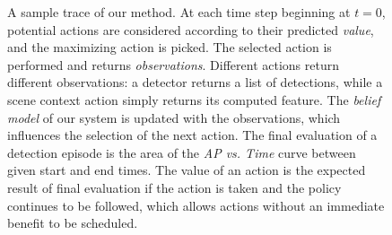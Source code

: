 \begin{figure}[ht!]
  \caption{
A sample trace of our method.
At each time step beginning at $t=0$, potential actions are considered according to their predicted \emph{value}, and the maximizing action is picked.
The selected action is performed and returns \emph{observations}.
Different actions return different observations: a detector returns a list of detections, while a scene context action simply returns its computed feature.
The \emph{belief model} of our system is updated with the observations, which influences the selection of the next action.
The final evaluation of a detection episode is the area of the \emph{AP vs. Time} curve between given start and end times.
The value of an action is the expected result of final evaluation if the action is taken and the policy continues to be followed, which allows actions without an immediate benefit to be scheduled.
}
  \label{fig:figure1}
\end{figure}
